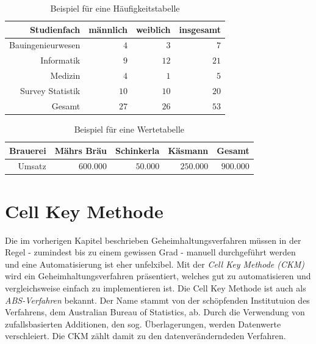 \begin{table}[h]
    \centering
    \begin{tabular}{ r r r r }
        \textbf{Studienfach} \vline & \textbf{männlich} & \textbf{weiblich} & \textbf{insgesamt} \\ 
        \hline
        Bauingenieurwesen \vline & $4$ & $3$ & $7$ \\
        Informatik \vline & $9$ & $12$ & $21$ \\  
        Medizin \vline & $4$ & $1$ & $5$ \\
        Survey Statistik \vline & $10$ & $10$ & $20$ \\
        \hline
        Gesamt \vline & $27$ & $26$ & $53$
    \end{tabular}
    \caption{Beispiel für eine Häufigkeitstabelle}
\end{table}

\begin{table}[h]
    \centering
    \begin{tabular}{ r r r r r }
        \textbf{Brauerei} \vline & \textbf{Mährs Bräu} & \textbf{Schinkerla} & \textbf{Käsmann} & \textbf{Gesamt} \\ 
        \hline
        Umsatz \vline & $600.000$ & $50.000$ & $250.000$ & $900.000$
        \end{tabular}
    \caption{Beispiel für eine Wertetabelle}
\end{table}



\section{Cell Key Methode}

Die im vorherigen Kapitel beschrieben Geheimhaltungsverfahren müssen in der Regel - zumindest bis zu einem gewissen Grad - manuell durchgeführt werden und eine Automatisierung ist eher unfelxibel. Mit der \textit{Cell Key Methode (CKM)} wird ein Geheimhaltungsverfahren präsentiert, welches gut zu automatisieren und vergleichsweise einfach zu implementieren ist. Die Cell Key Methode ist auch als \textit{ABS-Verfahren} bekannt. Der Name stammt von der schöpfenden Institutuion des Verfahrens, dem Australian Bureau of Statistics, ab. Durch die Verwendung von zufallsbasierten Additionen, den sog. Überlagerungen, werden Datenwerte verschleiert. Die CKM zählt damit zu den datenveränderndeden Verfahren. 

